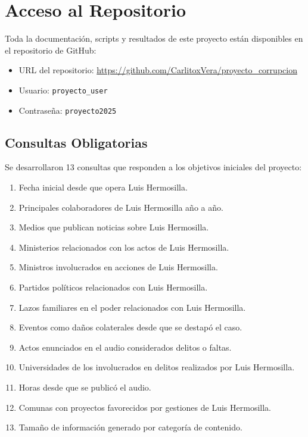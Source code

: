 \documentclass[a4paper, 12pt]{article}
\begin{document}
\section*{Acceso al Repositorio}
Toda la documentación, scripts y resultados de este proyecto están disponibles en el repositorio de GitHub:

\begin{itemize}
    \item URL del repositorio: \href{https://github.com/CarlitoxVera/proyecto_corrupcion}{https://github.com/CarlitoxVera/proyecto_corrupcion}
    \item Usuario: \texttt{proyecto\_user}
    \item Contraseña: \texttt{proyecto2025}
\end{itemize}

\subsection*{Consultas Obligatorias}
Se desarrollaron 13 consultas que responden a los objetivos iniciales del proyecto:
\begin{enumerate}
    \item Fecha inicial desde que opera Luis Hermosilla.
    \item Principales colaboradores de Luis Hermosilla año a año.
    \item Medios que publican noticias sobre Luis Hermosilla.
    \item Ministerios relacionados con los actos de Luis Hermosilla.
    \item Ministros involucrados en acciones de Luis Hermosilla.
    \item Partidos políticos relacionados con Luis Hermosilla.
    \item Lazos familiares en el poder relacionados con Luis Hermosilla.
    \item Eventos como daños colaterales desde que se destapó el caso.
    \item Actos enunciados en el audio considerados delitos o faltas.
    \item Universidades de los involucrados en delitos realizados por Luis Hermosilla.
    \item Horas desde que se publicó el audio.
    \item Comunas con proyectos favorecidos por gestiones de Luis Hermosilla.
    \item Tamaño de información generado por categoría de contenido.
\end{enumerate}
\end{document}
